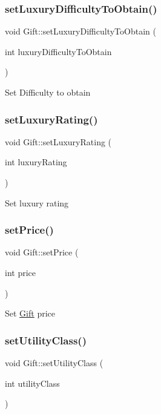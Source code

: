 \subsubsection{\texorpdfstring{set\+Luxury\+Difficulty\+To\+Obtain()}{setLuxuryDifficultyToObtain()}}
{\footnotesize\ttfamily void Gift\+::set\+Luxury\+Difficulty\+To\+Obtain (\begin{DoxyParamCaption}\item[{int}]{luxury\+Difficulty\+To\+Obtain }\end{DoxyParamCaption})}

Set Difficulty to obtain \mbox{\label{class_gift_a40b64181f527757f46ae01441c6a73e4}} 
\subsubsection{\texorpdfstring{set\+Luxury\+Rating()}{setLuxuryRating()}}
{\footnotesize\ttfamily void Gift\+::set\+Luxury\+Rating (\begin{DoxyParamCaption}\item[{int}]{luxury\+Rating }\end{DoxyParamCaption})}

Set luxury rating \mbox{\label{class_gift_a3e497fb858aade883c0b18c979963d83}} 
\subsubsection{\texorpdfstring{set\+Price()}{setPrice()}}
{\footnotesize\ttfamily void Gift\+::set\+Price (\begin{DoxyParamCaption}\item[{int}]{price }\end{DoxyParamCaption})}

Set \hyperlink{class_gift}{Gift} price \mbox{\label{class_gift_afc8d4b95e2a9b81ddb5ccf098b217dfc}} 
\subsubsection{\texorpdfstring{set\+Utility\+Class()}{setUtilityClass()}}
{\footnotesize\ttfamily void Gift\+::set\+Utility\+Class (\begin{DoxyParamCaption}\item[{int}]{utility\+Class }\end{DoxyParamCaption})}

